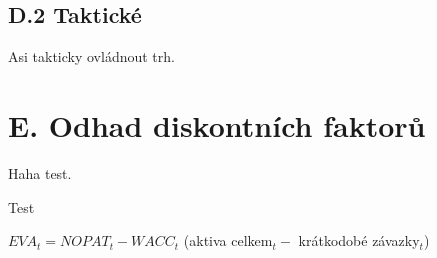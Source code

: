 \subsection*{D.2 Taktické}
\label{sec:Takticke}

Asi takticky ovládnout trh.

\section*{E. Odhad diskontních faktorů}
\label{sec:Odhad diskontnich faktoru}

Haha test.

Test 

$EVA_t = NOPAT_t - WACC_t$ (aktiva celkem$_t -$ krátkodobé závazky$_t$)

